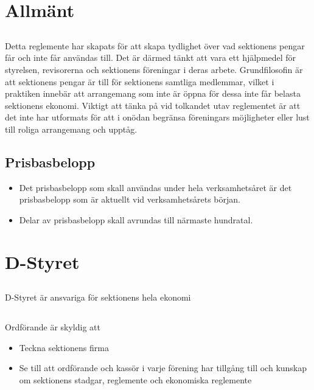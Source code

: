 \documentclass[a4paper, 10pt]{article}
\begin{document}
\newpage
\setcounter{tocdepth}{1}
\tableofcontents
\newpage

\section{Allmänt}
\subsection{}
Detta reglemente har skapats för att skapa tydlighet över vad sektionens pengar får och inte får användas till. Det är därmed tänkt att vara ett hjälpmedel för styrelsen, revisorerna och sektionens föreningar i deras arbete. Grundfilosofin är att sektionens pengar är till för sektionens samtliga medlemmar, vilket i praktiken innebär att arrangemang som inte är öppna för dessa inte får belasta sektionens ekonomi. Viktigt att tänka på vid tolkandet utav reglementet är att det inte har utformats för att i onödan begränsa föreningars möjligheter eller lust till roliga arrangemang och upptåg.
\subsection{Prisbasbelopp}
\begin{itemize}
  \item Det prisbasbelopp som skall användas under hela verksamhetsåret är det prisbasbelopp som är aktuellt vid verksamhetsårets början.
  \item Delar av prisbasbelopp skall avrundas till närmaste hundratal. 
\end{itemize}

\section{D-Styret}
\subsection{}
D-Styret är ansvariga för sektionens hela ekonomi
\subsection{}
Ordförande är skyldig att
\begin{itemize}
  \item Teckna sektionens firma
  \item Se till att ordförande och kassör i varje förening har tillgång till och kunskap om sektionens stadgar, reglemente och ekonomiska reglemente 
\end{itemize}
\end{document}
